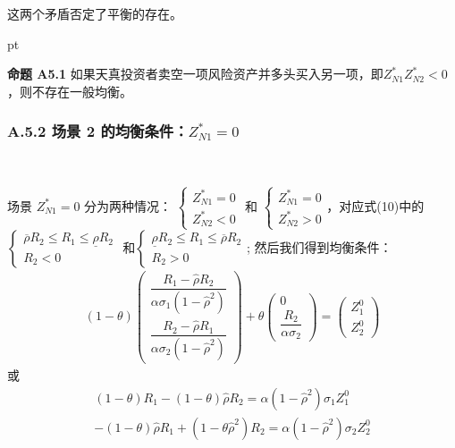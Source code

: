 \documentclass[10.0pt]{article}
\begin{document}
这两个矛盾否定了平衡的存在。

 pt

{\bf 命题 A5.1}  如果天真投资者卖空一项风险资产并多头买入另一项，即$ Z_{N 1}^* Z_{N 2}^* < 0 $，则不存在一般均衡。

\subsubsection*{A.5.2 \quad 场景 2 的均衡条件：$ Z_{N 1}^* = 0 $}

\quad \ 

场景 $ Z_{N 1}^* = 0 $ 分为两种情况： $ \left\{ \begin{matrix} Z_{N 1}^* = 0 \\ Z_{N 2}^* < 0 \end {matrix} \right. $ 和  $ \left\{ \begin{matrix} Z_{N 1}^* = 0 \\ Z_{N 2}^* > 0 \end{matrix} \right. $，对应式(10)中的$ \left\{ \begin{matrix} \overline{\rho} R_2 \leqslant R_1 \leqslant \underline{\rho} R_2 \\ R_2 < 0 \end{matrix} \right. $ 和$ \left\{ \begin{matrix} \underline{\rho} R_2 \leqslant R_1 \leqslant \overline{\rho} R_2 \\ R_2 > 0 \end{matrix} \right. $; 然后我们得到均衡条件：
\begin{eqnarray}
(1 - \theta) \left( \begin{matrix} \dfrac{R_1 - {\hat \rho} R_2}{\alpha \sigma_1 (1 - \hat \rho^2)} \\ \dfrac{R_2 - {\hat \rho} R_1}{\alpha \sigma_2 (1 - {\hat \rho}^2)} \end{matrix} \right) + \theta \left( \begin{matrix} 0 \\ \dfrac{R_2}{\alpha \sigma_2} \end{matrix} \right) = \left( \begin{matrix} Z_1^0 \\ Z_2^0 \end{matrix} \right)
\end{eqnarray}
或
\begin{eqnarray*}
& (1 - \theta) R_1 - (1 - \theta) {\hat \rho} R_2 = \alpha (1 - {\hat \rho}^2) \sigma_1 Z_1^0 & \\
& - (1 - \theta) {\hat \rho} R_1 + (1 - \theta {\hat \rho}^2) R_2 = \alpha (1 - {\hat \rho}^2) \sigma_2 Z_2^0 &
\end{eqnarray*}
\end{document}
